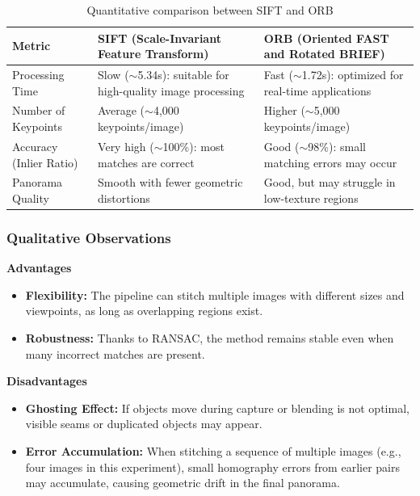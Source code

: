 \documentclass[a4paper,12pt]{article}
\begin{document}
\begin{table}[H]
\centering
\small
\begin{tabular}{|p{3.2cm}|p{5cm}|p{5cm}|}
\hline
\textbf{Metric} & \textbf{SIFT (Scale-Invariant Feature Transform)} & \textbf{ORB (Oriented FAST and Rotated BRIEF)} \\ \hline

Processing Time & Slow ($\sim$5.34s): suitable for high-quality image processing & Fast ($\sim$1.72s): optimized for real-time applications \\ \hline

Number of Keypoints & Average ($\sim$4,000 keypoints/image) & Higher ($\sim$5,000 keypoints/image) \\ \hline

Accuracy (Inlier Ratio) & Very high ($\sim$100\%): most matches are correct & Good ($\sim$98\%): small matching errors may occur \\ \hline

Panorama Quality & Smooth with fewer geometric distortions & Good, but may struggle in low-texture regions \\ \hline

\end{tabular}
\caption{Quantitative comparison between SIFT and ORB}
\end{table}

\subsubsection{Qualitative Observations}

\textbf{Advantages}
\begin{itemize}
    \item \textbf{Flexibility:} The pipeline can stitch multiple images with different sizes and viewpoints, as long as overlapping regions exist.
    \item \textbf{Robustness:} Thanks to RANSAC, the method remains stable even when many incorrect matches are present.
\end{itemize}

\textbf{Disadvantages}
\begin{itemize}
    \item \textbf{Ghosting Effect:} If objects move during capture or blending is not optimal, visible seams or duplicated objects may appear.
    \item \textbf{Error Accumulation:} When stitching a sequence of multiple images (e.g., four images in this experiment), small homography errors from earlier pairs may accumulate, causing geometric drift in the final panorama.
\end{itemize}
\end{document}
